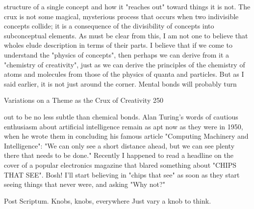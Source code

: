 structure of a single concept and how it "reaches out" toward things it is not. The crux
is not some magical, mysterious process that occurs when two indivisible concepts
collide; it is a consequence of the divisibility of concepts into subconceptual elements.
As must be clear from this, I am not one to believe that wholes elude description in
terms of their parts. I believe that if we come to understand the "physics of concepts",
then perhaps we can derive from it a "chemistry of creativity", just as we can derive
the principles of the chemistry of atoms and molecules from those of the physics of
quanta and particles. But as I said earlier, it is not just around the corner. Mental
bonds will probably turn




Variations on a Theme as the Crux of Creativity                                      250

out to be no less subtle than chemical bonds. Alan Turing's words of cautious
enthusiasm about artificial intelligence remain as apt now as they were in 1950, when
he wrote them in concluding his famous article "Computing Machinery and
Intelligence": "We can only see a short distance ahead, but we can see plenty there
that needs to be done."
        Recently I happened to read a headline on the cover of a popular electronics
magazine that blared something about "CHIPS THAT SEE". Bosh! I'll start believing
in "chips that see" as soon as they start seeing things that never were, and asking
"Why not?"

Post Scriptum.
                                                               Knobs, knobs, everywhere
                                                                Just vary a knob to think.

